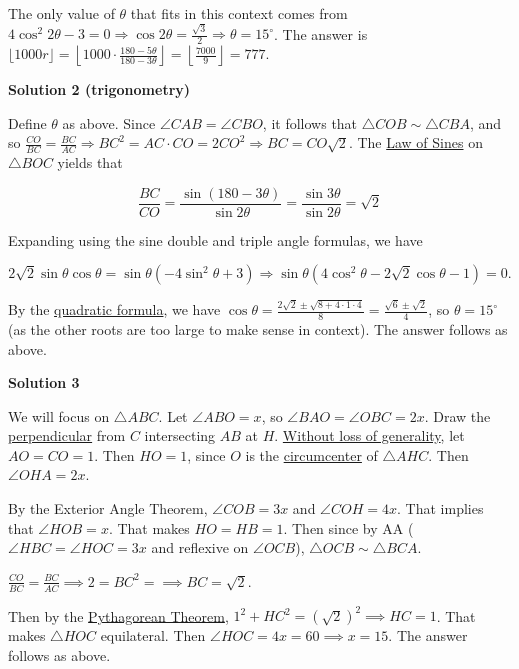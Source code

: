 \begin{enumerate}
 The only value of $\theta$ that fits in this context comes from $4 \cos^2 2\theta - 3 = 0 \Longrightarrow \cos 2\theta = \frac{\sqrt{3}}{2} \Longrightarrow \theta = 15^{\circ}$. The answer is $\lfloor 1000r \rfloor = \left\lfloor 1000 \cdot \frac{180 - 5\theta}{180 - 3\theta} \right\rfloor = \left \lfloor \frac{7000}{9} \right \rfloor = \boxed{777}$.

 



\textbf{Solution 2 (trigonometry)}

Define $\theta$ as above. Since $\angle CAB = \angle CBO$, it follows that $\triangle COB \sim \triangle CBA$, and so $\frac{CO}{BC} = \frac{BC}{AC} \Longrightarrow BC^2 = AC \cdot CO = 2CO^2 \Longrightarrow BC = CO\sqrt{2}$. The \href{https://artofproblemsolving.com/wiki/index.php?title=Law\_of\_Sines}{Law of Sines} on $\triangle BOC$ yields that 

 
 \[\frac{BC}{CO} = \frac{\sin (180-3\theta)}{\sin 2\theta} = \frac{\sin 3\theta}{\sin 2\theta} = \sqrt{2}\]

 Expanding using the sine double and triple angle formulas, we have 

 
 \[2\sqrt {2} \sin \theta \cos \theta = \sin\theta( - 4\sin ^2 \theta + 3) \Longrightarrow \sin \theta\left(4\cos^2\theta - 2\sqrt {2} \cos \theta - 1\right) = 0.\]

 By the \href{https://artofproblemsolving.com/wiki/index.php?title=Quadratic\_formula}{quadratic formula}, we have $\cos \theta = \frac {2\sqrt {2} \pm \sqrt {8 + 4 \cdot 1 \cdot 4}}{8} = \frac {\sqrt {6} \pm \sqrt {2}}{4}$, so $\theta = 15^{\circ}$ (as the other roots are too large to make sense in context). The answer follows as above.

 



\textbf{Solution 3}

We will focus on $\triangle ABC$. Let $\angle ABO = x$, so $\angle BAO = \angle OBC = 2x$. Draw the \href{https://artofproblemsolving.com/wiki/index.php?title=Perpendicular}{perpendicular} from $C$ intersecting $AB$ at $H$. \href{https://artofproblemsolving.com/wiki/index.php?title=Without\_loss\_of\_generality}{Without loss of generality}, let $AO = CO = 1$. Then $HO = 1$, since $O$ is the \href{https://artofproblemsolving.com/wiki/index.php?title=Circumcenter}{circumcenter} of $\triangle AHC$. Then $\angle OHA = 2x$. 

 By the Exterior Angle Theorem, $\angle COB = 3x$ and $\angle COH = 4x$. That implies that $\angle HOB = x$. That makes $HO = HB = 1$. Then since by AA ($\angle HBC = \angle HOC = 3x$ and reflexive on $\angle OCB$), $\triangle OCB \sim \triangle BCA$.

 $\frac {CO}{BC} = \frac {BC}{AC} \implies 2 = BC^2 = \implies BC = \sqrt {2}.$

 Then by the \href{https://artofproblemsolving.com/wiki/index.php?title=Pythagorean\_Theorem}{Pythagorean Theorem}, $1^2 + HC^2 = \left(\sqrt {2}\right)^2\implies HC = 1$. That makes $\triangle HOC$ equilateral. Then $\angle HOC = 4x = 60 \implies x = 15$. The answer follows as above. 

 


\end{enumerate}